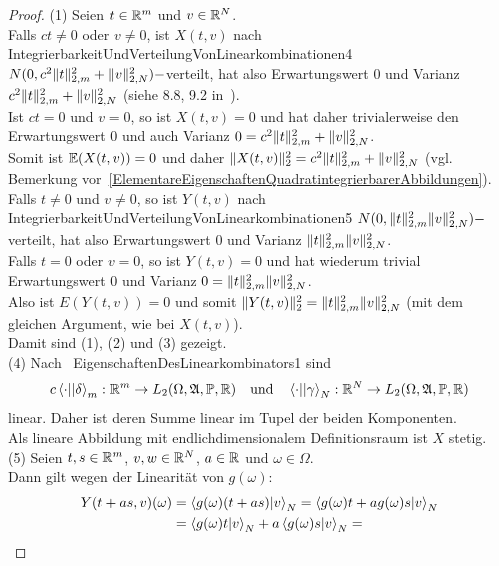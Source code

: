 \begin{proof}
(1) Seien $t \in \mathbb{R}^m$ und $v \in \mathbb{R}^N$.\\
Falls $ct\neq 0$ oder $v \neq 0$, ist $X(t,v)$ nach
         {IntegrierbarkeitUndVerteilungVonLinearkombinationen4}
$N(0, c^2\lVert t\rVert_{2, m}^2 + \lVert v\rVert_{2,N}^2)-$verteilt, hat also Erwartungswert
0 und Varianz $c^2\lVert t\rVert_{2, m}^2 + \lVert v\rVert_{2,N}^2$ 
(siehe 8.8, 9.2 in~\cite{Irle}).\\
Ist $ct = 0$ und $v = 0$, so ist $X(t, v) = 0$ und hat daher trivialerweise den
Erwartungswert 0 und auch Varianz 
$0 = c^2\lVert t\rVert_{2, m}^2 + \lVert v\rVert_{2,N}^2$.\\
Somit ist $\mathbb{E}(X(t, v)) = 0$ und daher
$\lVert X(t,v)\rVert_2^2 = c^2\lVert t\rVert_{2, m}^2 + \lVert v\rVert_{2,N}^2$ (vgl. Bemerkung vor~\ref{ElementareEigenschaftenQuadratintegrierbarerAbbildungen}).\\
Falls $t \neq 0$ und $v \neq 0$, so ist $Y(t,v)$ nach~
         {IntegrierbarkeitUndVerteilungVonLinearkombinationen5}
$N(0, \lVert t\rVert _{2,m}^2 \lVert v\rVert_{2, N}^2)-$verteilt, hat also Erwartungswert 0
und Varianz $\lVert t\rVert_{2,m}^2\lVert v\rVert_{2,N}^2$.\\
Falls $t = 0$ oder $v = 0$, so ist $Y(t, v) = 0$ und hat wiederum trivial
Erwartungswert 0 und Varianz $0=\lVert t\rVert _{2,m}^2 \lVert v\rVert_{2, N}^2$.\\
Also ist $E(Y(t, v))= 0$ und 
somit $\lVert Y(t, v)\rVert_2^2 = \lVert t\rVert _{2,m}^2 \lVert v\rVert_{2, N}^2$ (mit dem
gleichen Argument, wie bei $X(t, v)$).\\
Damit sind (1), (2) und (3) gezeigt.\\
(4) Nach~
{EigenschaftenDesLinearkombinators1}
sind \[c\left\langle \cdot ||\delta\right\rangle_m:\mathbb{R}^m \rightarrow L_2(\Omega,\mathfrak{A}, \mathbb{P}, \mathbb{R})
\quad \text{und}\quad 
\left\langle \cdot ||\gamma\right\rangle_N:\mathbb{R}^N \rightarrow L_2(\Omega,\mathfrak{A}, \mathbb{P},\mathbb{R})\] linear.
Daher ist deren Summe linear im Tupel der beiden Komponenten.\\
Als lineare Abbildung mit endlichdimensionalem Definitionsraum ist $X$
stetig.\\
(5) Seien $t,s\in \mathbb{R}^m$, $v, w \in \mathbb{R}^N$, $a \in \mathbb{R}$ und $\omega \in \Omega$.\\
Dann gilt wegen der Linearität von $g(\omega)$:
\begin{align*}
Y(t+as, v)(\omega)& = \sprod{g(\omega)(t+as)}v_N 
= \sprod{g(\omega)t + ag(\omega)s}v_N\\
&= \sprod{g(\omega)t}v_N + a\sprod{g(\omega)s}v_N =

\end{align*}
\end{proof}
